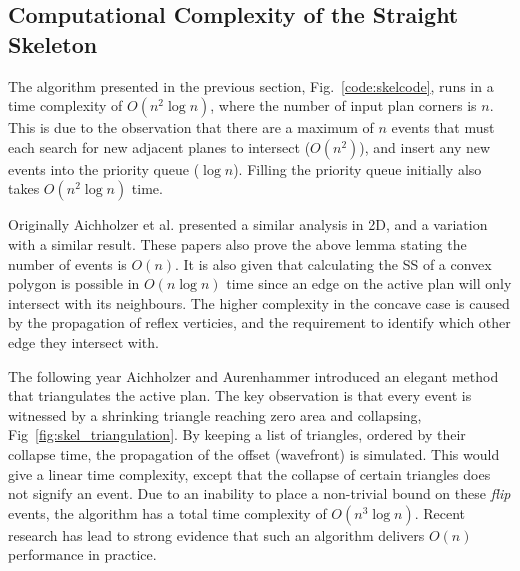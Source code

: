 
\FloatBarrier

\subsection{Computational Complexity of the Straight Skeleton}



The algorithm presented in the previous section, Fig.~\ref{code:skelcode}, runs in a time complexity of $O(n^2 \log n)$, where the number of input plan corners is $n$. This is due to the observation that there are a maximum of $n$ events that must each search for new adjacent planes to intersect ($O(n^2)$), and insert any new events into the priority queue ($\log n$). Filling the priority queue initially also takes $O(n^2 \log n)$ time.

Originally Aichholzer et al.  presented a similar analysis in 2D\cite{Aichholzer95},  and a variation with a similar result\cite{Aichholzer95:SSSP}. These papers also prove the above lemma stating the number of events is $O(n)$. It is also given that calculating the SS of a convex polygon is possible in $O(n \log n)$ time since an edge on the active plan will only intersect with its neighbours. The higher complexity in the concave case is caused by the propagation of reflex verticies, and the requirement to identify which other edge they intersect with. 

The following year Aichholzer and Aurenhammer\cite{Aichholzer:1996:SKF} introduced an elegant method that triangulates the active plan.%
The key observation is that every event is witnessed by a shrinking triangle reaching zero area and collapsing, Fig~\ref{fig:skel_triangulation}. By keeping a list of triangles, ordered by their collapse time, the propagation of the offset (wavefront) is simulated. This would give a linear time complexity, except that the collapse of certain triangles does not signify an event. Due to an inability to place a non-trivial bound on these \emph{flip} events, the algorithm has a total time complexity of $O(n^3 \log n)$. Recent research has lead to strong evidence that such an algorithm delivers $O(n)$ performance in practice\cite{Palfrader12}. 


